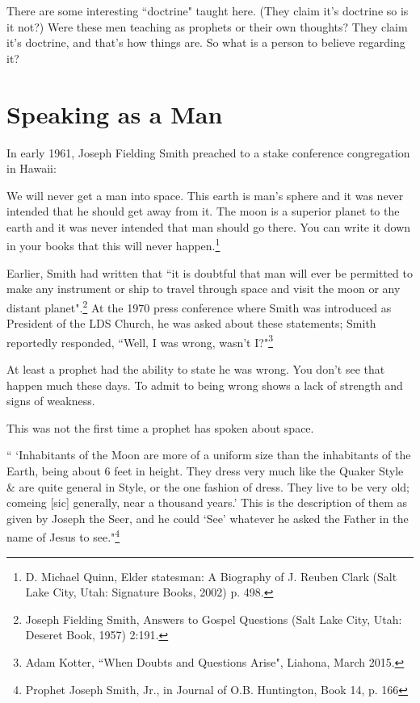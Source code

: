 There are some interesting ``doctrine" taught here. (They claim it's doctrine so
is it not?) Were these men teaching as prophets or their own thoughts? They claim
it's doctrine, and that's how things are. So what is a person to believe regarding
it?

\section{Speaking as a Man}

In early 1961, Joseph Fielding Smith preached to a stake conference congregation in 
Hawaii:

\begin{displayquote}
We will never get a man into space. This earth is man's sphere and it was never 
intended that he should get away from it. The moon is a superior planet to the 
earth and it was never intended that man should go there. You can write it down in 
your books that this will never happen.\footnote{D. Michael Quinn, Elder statesman: 
A Biography of J. Reuben Clark (Salt Lake City, Utah: Signature Books, 2002) p. 498.}

Earlier, Smith had written that ``it is doubtful that man will ever be permitted 
to make any instrument or ship to travel through space and visit the moon or any 
distant planet".\footnote{Joseph Fielding Smith, Answers to Gospel Questions (Salt 
Lake City, Utah: Deseret Book, 1957) 2:191.} At the 1970 press conference where Smith 
was introduced as President of the LDS Church, he was asked about these statements; 
Smith reportedly responded, ``Well, I was wrong, wasn't I?"\footnote{
Adam Kotter, ``When Doubts and Questions Arise", Liahona, March 2015.
}
\end{displayquote}

At least a prophet had the ability to state he was wrong. You don't see that happen
much these days. To admit to being wrong shows a lack of strength and signs of
weakness.

This was not the first time a prophet has spoken about space.

\begin{displayquote}
`` `Inhabitants of the Moon are more of a uniform size than the inhabitants of the 
Earth, being about 6 feet in height. They dress very much like the Quaker Style \& 
are quite general in Style, or the one fashion of dress. They live to be very old; 
comeing [sic] generally, near a thousand years.' This is the description of them as 
given by Joseph the Seer, and he could `See' whatever he asked the Father in the 
name of Jesus to see."\footnote{
Prophet Joseph Smith, Jr., in Journal of O.B. Huntington, Book 14, p. 166
}
\end{displayquote}

